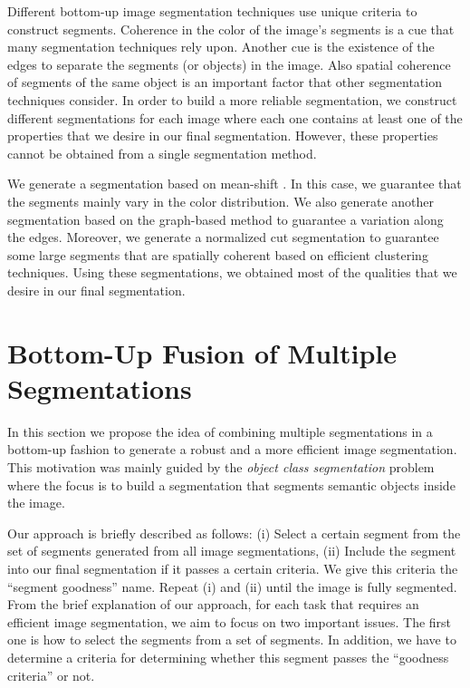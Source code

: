 \documentclass{llncs}
\begin{document}
Different bottom-up image segmentation techniques use unique criteria to construct segments.
Coherence in the color of the image's segments is a cue that many segmentation techniques rely upon.
Another cue is the existence of the edges to separate the segments (or objects) in the image.
Also spatial coherence of segments of the same object is an important factor that other segmentation techniques consider.
In order to build a more reliable segmentation, we construct different segmentations for each image where
each one contains at least one of the properties that we desire in our final segmentation.
However, these properties cannot be obtained from a single segmentation method.

We generate a segmentation based on mean-shift \cite{Comaniciu02meanshift}.
In this case, we guarantee that the segments mainly vary in the color distribution.
We also generate another segmentation based on the graph-based method
\cite{Felzenszwalb04efficientgraph-based} to guarantee a variation along the edges.
Moreover, we generate a normalized cut \cite{Shi_2000_3808} segmentation to guarantee some large segments that are spatially coherent
based on efficient clustering techniques. Using these segmentations, we obtained most of the qualities that we desire in our final segmentation.

\section{Bottom-Up Fusion of Multiple Segmentations}

In this section we propose the idea of combining multiple segmentations in a bottom-up fashion to generate a robust
and a more efficient image segmentation. This motivation was mainly guided by the \textit{object class segmentation} problem
where the focus is to build a segmentation that segments semantic objects inside the image.

Our approach is briefly described as follows: (i) Select a certain segment from the set of segments generated from
all image segmentations, (ii) Include the segment into our final segmentation if it passes a certain criteria.
We give this criteria the ``segment goodness'' name. Repeat (i) and (ii) until the image is fully segmented.
From the brief explanation of our approach, for each task that requires an efficient image segmentation, we aim to
focus on two important issues. The first one is how to select the segments from a set of segments. In addition,
we have to determine a criteria for determining whether this segment passes the ``goodness criteria'' or not.
\end{document}
